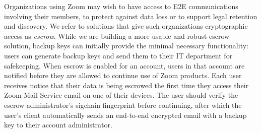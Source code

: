 Organizations using Zoom may wish to have access to E2E communications involving their members, to
protect against data loss or to support legal retention and discovery. We refer to solutions that
give such organizations cryptographic access as \textit{escrow}.  While we are building a more
usable and robust escrow solution, backup keys can initially provide the minimal necessary
functionality: users can generate backup keys and send them to their IT department for safekeeping.
When escrow is enabled for an account, users in that account are notified before they are allowed to
continue use of Zoom products. Each user receives notice that their data is being escrowed the
first time they access their Zoom Mail Service email on one of their devices. The user should verify
the escrow administrator's sigchain fingerprint before continuing, after which the user's client
automatically sends an end-to-end encrypted email with a backup key to their account administrator.
